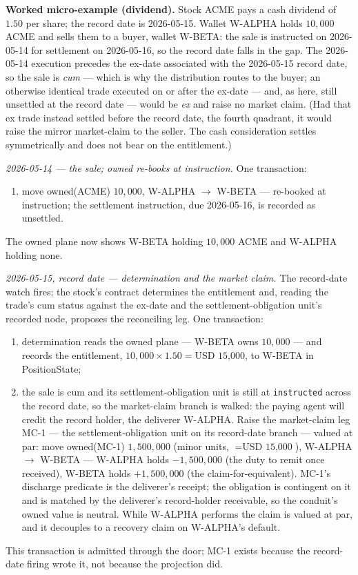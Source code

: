 \documentclass[11pt,a4paper]{article}
\newcommand{\USD}[1]{\mbox{USD~#1}}
\begin{document}
\medskip\noindent\textbf{Worked micro-example (dividend).} Stock ACME pays a cash
dividend of $1.50$ per share; the record date is 2026-05-15. Wallet W-ALPHA holds
$10{,}000$ ACME and sells them to a buyer, wallet W-BETA: the sale is instructed on
2026-05-14 for settlement on 2026-05-16, so the record date falls in the gap. The
2026-05-14 execution precedes the ex-date associated with the 2026-05-15 record date,
so the sale is \emph{cum} --- which is why the distribution routes to the buyer; an
otherwise identical trade executed on or after the ex-date --- and, as here, still
unsettled at the record date --- would be \emph{ex} and raise no market claim. (Had that
ex trade instead settled before the record date, the fourth quadrant, it would raise the
mirror market-claim to the seller. The cash consideration settles symmetrically and does
not bear on the entitlement.)

\emph{2026-05-14 --- the sale; owned re-books at instruction.} One transaction:
\begin{enumerate}[label=(\arabic*),nosep]
\item move owned(ACME) $10{,}000$, W-ALPHA $\to$ W-BETA --- re-booked at
instruction; the settlement instruction, due 2026-05-16, is recorded as unsettled.
\end{enumerate}
The owned plane now shows W-BETA holding $10{,}000$ ACME and W-ALPHA holding none.

\emph{2026-05-15, record date --- determination and the market claim.} The
record-date watch fires; the stock's contract determines the entitlement and, reading
the trade's cum status against the ex-date and the settlement-obligation unit's recorded
node, proposes the reconciling leg. One transaction:
\begin{enumerate}[label=(\arabic*),nosep]
\item determination reads the owned plane --- W-BETA owns $10{,}000$ --- and records
the entitlement, $10{,}000 \times 1.50 = \USD{15{,}000}$, to W-BETA in PositionState;
\item the sale is cum and its settlement-obligation unit is still at \texttt{instructed}
across the record date, so the market-claim branch is walked: the paying agent will credit
the record holder, the deliverer W-ALPHA. Raise the market-claim leg MC-1 --- the
settlement-obligation unit on its record-date branch ---
valued at par: move owned(MC-1) $1{,}500{,}000$ (minor units, $=\USD{15{,}000}$),
W-ALPHA $\to$ W-BETA --- W-ALPHA holds $-1{,}500{,}000$ (the duty to remit once
received), W-BETA holds $+1{,}500{,}000$ (the claim-for-equivalent). MC-1's discharge
predicate is the deliverer's receipt; the obligation is contingent on it and is
matched by the deliverer's record-holder receivable, so the conduit's owned value is
neutral. While W-ALPHA performs the claim is valued at par, and it decouples to a
recovery claim on W-ALPHA's default.
\end{enumerate}
This transaction is admitted through the door; MC-1 exists because the record-date
firing wrote it, not because the projection did.
\end{document}
